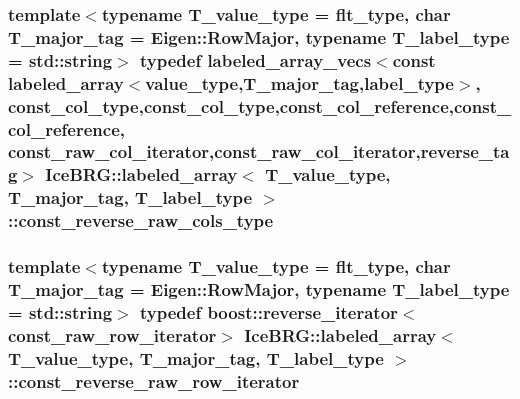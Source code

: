\subsubsection[{const\+\_\+reverse\+\_\+raw\+\_\+cols\+\_\+type}]{\setlength{\rightskip}{0pt plus 5cm}template$<$typename T\+\_\+value\+\_\+type = flt\+\_\+type, char T\+\_\+major\+\_\+tag = Eigen\+::\+Row\+Major, typename T\+\_\+label\+\_\+type = std\+::string$>$ typedef {\bf labeled\+\_\+array\+\_\+vecs}$<$const {\bf labeled\+\_\+array}$<${\bf value\+\_\+type},T\+\_\+major\+\_\+tag,{\bf label\+\_\+type}$>$, {\bf const\+\_\+col\+\_\+type},{\bf const\+\_\+col\+\_\+type},{\bf const\+\_\+col\+\_\+reference},{\bf const\+\_\+col\+\_\+reference}, {\bf const\+\_\+raw\+\_\+col\+\_\+iterator},{\bf const\+\_\+raw\+\_\+col\+\_\+iterator},{\bf reverse\+\_\+tag}$>$ {\bf Ice\+B\+R\+G\+::labeled\+\_\+array}$<$ T\+\_\+value\+\_\+type, T\+\_\+major\+\_\+tag, T\+\_\+label\+\_\+type $>$\+::{\bf const\+\_\+reverse\+\_\+raw\+\_\+cols\+\_\+type}}\label{classIceBRG_1_1labeled__array_ae4061b413f50fe4f35caacf5318ba324}
\hypertarget{classIceBRG_1_1labeled__array_a4f41b194ac74740bac37a7e0ff051a4f}{}
\subsubsection[{const\+\_\+reverse\+\_\+raw\+\_\+row\+\_\+iterator}]{\setlength{\rightskip}{0pt plus 5cm}template$<$typename T\+\_\+value\+\_\+type = flt\+\_\+type, char T\+\_\+major\+\_\+tag = Eigen\+::\+Row\+Major, typename T\+\_\+label\+\_\+type = std\+::string$>$ typedef boost\+::reverse\+\_\+iterator$<${\bf const\+\_\+raw\+\_\+row\+\_\+iterator}$>$ {\bf Ice\+B\+R\+G\+::labeled\+\_\+array}$<$ T\+\_\+value\+\_\+type, T\+\_\+major\+\_\+tag, T\+\_\+label\+\_\+type $>$\+::{\bf const\+\_\+reverse\+\_\+raw\+\_\+row\+\_\+iterator}}\label{classIceBRG_1_1labeled__array_a4f41b194ac74740bac37a7e0ff051a4f}
\hypertarget{classIceBRG_1_1labeled__array_a83872d8babf4f2e0db65776cac90aa38}{}
